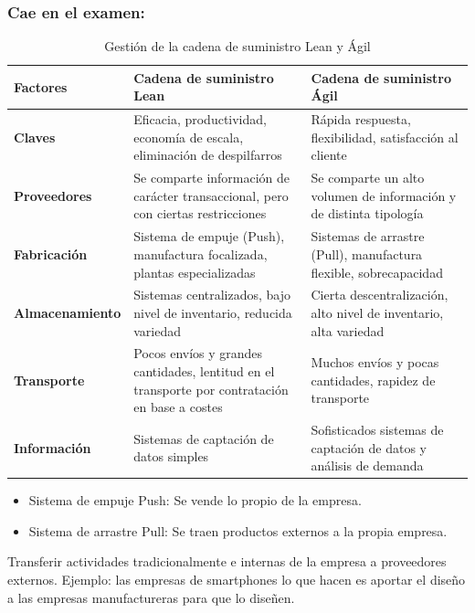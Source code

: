 \documentclass[12pt]{book} %
\providecommand{\tightlist}{%
  \setlength{\itemsep}{0pt}\setlength{\parskip}{0pt}}
\begin{document}
\subsubsection*{Cae en el examen:}

\begin{table}[H]
\centering
\caption{Gestión de la cadena de suministro Lean y Ágil}
\begin{tabular}{|l|p{6cm}|p{6cm}|}
\hline
\textbf{Factores} & \textbf{Cadena de suministro Lean} & \textbf{Cadena de suministro Ágil} \\ \hline
\textbf{Claves} & Eficacia, productividad, economía de escala, eliminación de despilfarros & Rápida respuesta, flexibilidad, satisfacción al cliente \\ \hline
\textbf{Proveedores} & Se comparte información de carácter transaccional, pero con ciertas restricciones & Se comparte un alto volumen de información y de distinta tipología \\ \hline
\textbf{Fabricación} & Sistema de empuje (Push), manufactura focalizada, plantas especializadas & Sistemas de arrastre (Pull), manufactura flexible, sobrecapacidad \\ \hline
\textbf{Almacenamiento} & Sistemas centralizados, bajo nivel de inventario, reducida variedad & Cierta descentralización, alto nivel de inventario, alta variedad \\ \hline
\textbf{Transporte} & Pocos envíos y grandes cantidades, lentitud en el transporte por contratación en base a costes & Muchos envíos y pocas cantidades, rapidez de transporte \\ \hline
\textbf{Información} & Sistemas de captación de datos simples & Sofisticados sistemas de captación de datos y análisis de demanda \\ \hline
\end{tabular}
\end{table}

\begin{itemize}
\tightlist
\item
  Sistema de empuje Push: Se vende lo propio de la empresa.
\item
  Sistema de arrastre Pull: Se traen productos externos a la propia
  empresa.
\end{itemize}

\begin{definicion}
Transferir actividades tradicionalmente e internas de la empresa a proveedores externos. Ejemplo: las empresas de smartphones lo que hacen es aportar el diseño a las empresas manufactureras para que lo diseñen.
\end{definicion}
\end{document}
